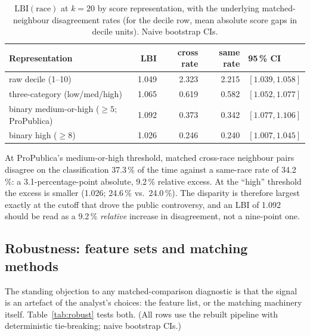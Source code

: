 \documentclass[11pt]{article}
\begin{document}
\begin{table}[h]
\centering
\caption{$\mathrm{LBI}(\text{race})$ at $k = 20$ by score
representation, with the underlying matched-neighbour disagreement
rates (for the decile row, mean absolute score gaps in decile
units). Naive bootstrap CIs.}
\label{tab:scorerep}
\begin{tabular}{lrrrl}
\toprule
\textbf{Representation} & \textbf{LBI} & \textbf{cross rate} &
\textbf{same rate} & \textbf{95\,\% CI} \\
\midrule
raw decile (1--10) & 1.049 & 2.323 & 2.215 & $[1.039, 1.058]$ \\
three-category (low/med/high) & 1.065 & 0.619 & 0.582 & $[1.052, 1.077]$ \\
binary medium-or-high ($\geq 5$; ProPublica) & 1.092 & 0.373 & 0.342 & $[1.077, 1.106]$ \\
binary high ($\geq 8$) & 1.026 & 0.246 & 0.240 & $[1.007, 1.045]$ \\
\bottomrule
\end{tabular}
\end{table}

At ProPublica's medium-or-high threshold, matched cross-race
neighbour pairs disagree on the classification 37.3\,\% of the time
against a same-race rate of 34.2\,\%: a 3.1-percentage-point
absolute, 9.2\,\% relative excess. At the ``high'' threshold the
excess is smaller (1.026; 24.6\,\% vs.\ 24.0\,\%). The disparity is
therefore largest exactly at the cutoff that drove the public
controversy, and an LBI of 1.092 should be read as a 9.2\,\%
\emph{relative} increase in disagreement, not a nine-point one.

\subsection{Robustness: feature sets and matching methods}
\label{sec:robustness}

The standing objection to any matched-comparison diagnostic is that
the signal is an artefact of the analyst's choices: the feature list,
or the matching machinery itself. Table~\ref{tab:robust} tests both.
(All rows use the rebuilt pipeline with deterministic tie-breaking;
naive bootstrap CIs.)
\end{document}

